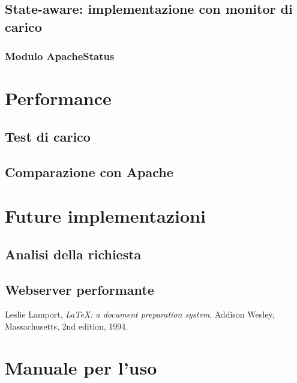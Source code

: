 \documentclass[italian]{tktltiki2}
\begin{document}
\subsection{State-aware: implementazione con monitor di carico}
\subsubsection{Modulo ApacheStatus}


\newpage
\section{Performance}
\subsection{Test di carico}
\subsection{Comparazione con Apache}
\newpage
\section{Future implementazioni}
\subsection{Analisi della richiesta}
\subsection{Webserver performante}


%
%
% 
%


\newpage
%
%
\renewcommand{\refname}{\normalfont\selectfont\normalsize\textbf{Annotazioni}} 
\begin{thebibliography}{9}
  Leslie Lamport,
  \emph{\LaTeX: a document preparation system},
  Addison Wesley, Massachusetts,
  2nd edition,
  1994.
  
\end{thebibliography}

\newpage
\appendix
 
\section{Manuale per l'uso}
\end{document}
